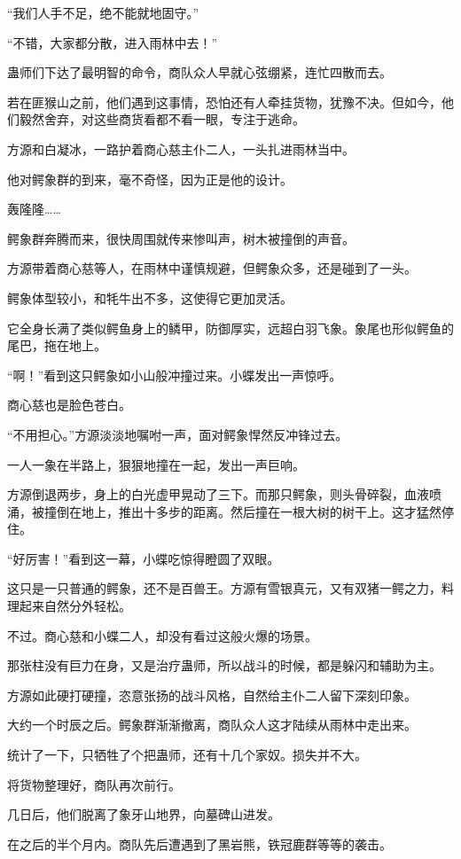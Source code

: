 \begin{this_body}
“我们人手不足，绝不能就地固守。”

“不错，大家都分散，进入雨林中去！”

蛊师们下达了最明智的命令，商队众人早就心弦绷紧，连忙四散而去。

若在匪猴山之前，他们遇到这事情，恐怕还有人牵挂货物，犹豫不决。但如今，他们毅然舍弃，对这些商货看都不看一眼，专注于逃命。

方源和白凝冰，一路护着商心慈主仆二人，一头扎进雨林当中。

他对鳄象群的到来，毫不奇怪，因为正是他的设计。

轰隆隆……

鳄象群奔腾而来，很快周围就传来惨叫声，树木被撞倒的声音。

方源带着商心慈等人，在雨林中谨慎规避，但鳄象众多，还是碰到了一头。

鳄象体型较小，和牦牛出不多，这使得它更加灵活。

它全身长满了类似鳄鱼身上的鳞甲，防御厚实，远超白羽飞象。象尾也形似鳄鱼的尾巴，拖在地上。

“啊！”看到这只鳄象如小山般冲撞过来。小蝶发出一声惊呼。

商心慈也是脸色苍白。

“不用担心。”方源淡淡地嘱咐一声，面对鳄象悍然反冲锋过去。

一人一象在半路上，狠狠地撞在一起，发出一声巨响。

方源倒退两步，身上的白光虚甲晃动了三下。而那只鳄象，则头骨碎裂，血液喷涌，被撞倒在地上，推出十多步的距离。然后撞在一根大树的树干上。这才猛然停住。

“好厉害！”看到这一幕，小蝶吃惊得瞪圆了双眼。

这只是一只普通的鳄象，还不是百兽王。方源有雪银真元，又有双猪一鳄之力，料理起来自然分外轻松。

不过。商心慈和小蝶二人，却没有看过这般火爆的场景。

那张柱没有巨力在身，又是治疗蛊师，所以战斗的时候，都是躲闪和辅助为主。

方源如此硬打硬撞，恣意张扬的战斗风格，自然给主仆二人留下深刻印象。

大约一个时辰之后。鳄象群渐渐撤离，商队众人这才陆续从雨林中走出来。

统计了一下，只牺牲了个把蛊师，还有十几个家奴。损失并不大。

将货物整理好，商队再次前行。

几日后，他们脱离了象牙山地界，向墓碑山进发。

在之后的半个月内。商队先后遭遇到了黑岩熊，铁冠鹿群等等的袭击。


\end{this_body}
